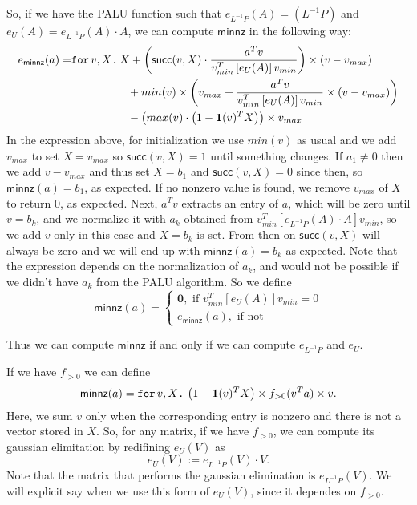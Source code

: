 So, if we have the PALU function such that $e_{L^{-1}P}(A)=(L^{-1}P)$ and $e_U(A)=e_{L^{-1}P}(A)\cdot A$, we can compute $\mathsf{minnz}$ in the following way:
\begin{align*}
    e_{\mathsf{minnz}}(a)=&\texttt{for}\, v,X \texttt{.}\, X+\left( \mathsf{succ}(v,X)\cdot\dfrac{a^Tv}{v_{min}^T\left[ e_{U}(A)\right]v_{min}} \right)\times (v-v_{max}) \\
    &\hspace{5em} + min(v)\times\left( v_{max} + \dfrac{a^Tv}{v_{min}^T\left[ e_{U}(A)\right]v_{min}}\times (v-v_{max})\right) \\
    &\hspace{5em} - \left( max(v)\cdot\left( 1-\mathbf{1}(v)^TX \right)\right)\times v_{max}
\end{align*}
In the expression above, for initialization we use $min(v)$ as usual and we add $v_{max}$ to set $X=v_{max}$ so $\mathsf{succ}(v,X)=1$ until something changes. If $a_1\neq 0$ then we add $v-v_{max}$ and thus set $X=b_1$ and $\mathsf{succ}(v,X)=0$ since then, so $\mathsf{minnz}(a)=b_1$, as expected. If no nonzero value is found, we remove $v_{max}$ of $X$ to return $0$, as expected.
Next, $a^Tv$ extracts an entry of $a$, which will be zero until $v=b_k$, and we normalize it with $a_k$ obtained from $v_{min}^T\left[ e_{L^{-1}P}(A)\cdot A\right]v_{min}$, so we add $v$ only in this case and $X=b_k$ is set. From then on $\mathsf{succ}(v,X)$ will always be zero and we will end up with $\mathsf{minnz}(a)=b_k$ as expected. 
Note that the expression depends on the normalization of $a_k$, and would not be possible if we didn't have $a_k$ from the PALU algorithm.
So we define
\[
\mathsf{minnz}(a)=\begin{cases}
               \mathbf{0}, \text{ if } v_{min}^T\left[ e_{U}(A)\right]v_{min}=0 \\
               e_{\mathsf{minnz}}(a), \text{ if not}
            \end{cases}
\]

Thus we can compute $\mathsf{minnz}$ if and only if we can compute $e_{L^{-1}P}$ and $e_{U}$.

If we have $f_{>0}$ we can define $$\mathsf{minnz}(a)=\texttt{for}\, v,X \texttt{.}\, \left( 1-\mathbf{1}(v)^TX \right) \times f_{>0}(v^Ta)\times v.$$
Here, we sum $v$ only when the corresponding entry is nonzero and there is not a vector stored in $X$.
So, for any matrix, if we have $f_{>0}$, we can compute its gaussian elimitation by redifining $e_{U}(V)$ as
$$
e_{U}(V) :=  e_{L^{-1}P}(V) \cdot V.
$$
Note that the matrix that performs the gaussian elimination is $e_{L^{-1}P}(V)$. We will explicit say when we use this form of $e_U(V)$, since it dependes on $f_{>0}$.
